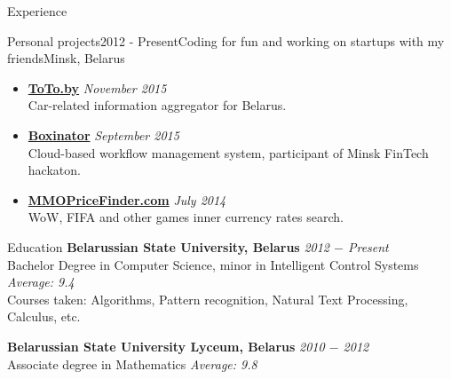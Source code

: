 \documentclass{resume} %
\begin{document}
\begin{rSection}{Experience}
\begin{rSubsection}{Personal projects}{2012 - Present}{Coding for fun and working on startups with my friends}{Minsk, Belarus}
\begin{itemize}[leftmargin=*,label={$+$}]
  \item {\bf \href{http://toto.by}{ToTo.by}} \hfill {\em November 2015}  \\
	Car-related information aggregator for Belarus.

  \item {\bf \href{http://boxinator.xyz}{Boxinator}} \hfill {\em September 2015} \\
	Cloud-based workflow management system, participant of Minsk FinTech hackaton.

  \item {\bf \href{http://mmopricefinder.com}{MMOPriceFinder.com}} \hfill {\em July 2014} \\
	WoW, FIFA and other games inner currency rates search.

\end{itemize}
\end{rSubsection}
\end{rSection}


\begin{rSection}{Education}
{\bf Belarussian State University, Belarus} \hfill {\em 2012 $-$ Present} \\
Bachelor Degree in Computer Science, minor in Intelligent Control Systems \hfill {\em Average: 9.4} \\
Courses taken: Algorithms, Pattern recognition, Natural Text Processing, Calculus, etc.

{\bf Belarussian State University Lyceum, Belarus} \hfill {\em 2010 $-$ 2012} \\
Associate degree in Mathematics \hfill {\em Average: 9.8}

\end{rSection}

\end{document}
